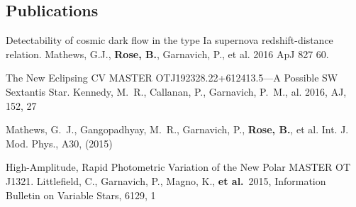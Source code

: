 \documentclass[margin]{res}
\begin{document}
\begin{resume}
\section{Publications}
Detectability of cosmic dark flow in the type Ia supernova redshift-distance relation. Mathews, G.J., {\bf Rose, B.}, Garnavich, P., et al. 2016 ApJ 827 60.

The New Eclipsing CV MASTER OTJ192328.22+612413.5—A Possible SW Sextantis Star. Kennedy, M.~R., Callanan, P., Garnavich, P.~M., {\bfet al.} 2016, AJ, 152, 27

Mathews, G.~J., Gangopadhyay, M.~R., Garnavich, P., {\bf Rose, B.}, et al. Int. J. Mod. Phys., A30, (2015)

High-Amplitude, Rapid Photometric Variation of the New Polar MASTER OT J1321. Littlefield, C., Garnavich, P., Magno, K., {\bf et al.}\ 2015, Information Bulletin on Variable Stars, 6129, 1


\newpage
\addtocounter{section}{1}
{}




\nocite{*}







\end{resume}
\end{document}
